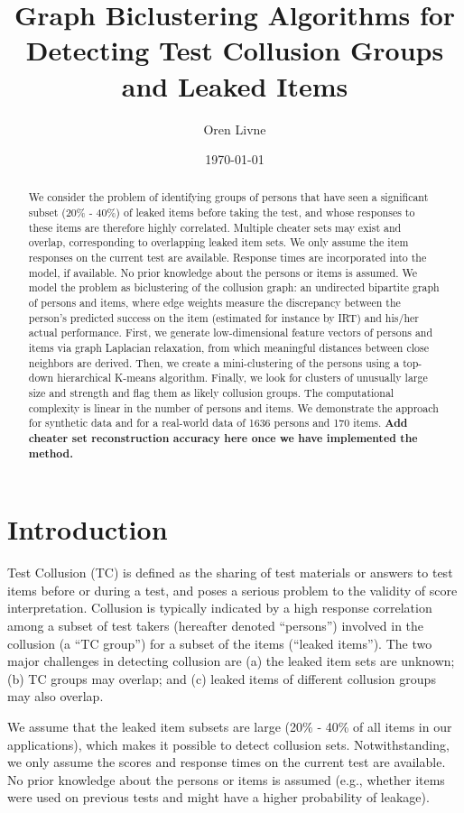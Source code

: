 \documentclass{article}
\title{Graph Biclustering Algorithms for Detecting Test Collusion Groups and Leaked Items}
\author[1]{Oren Livne}
\affil[1]{Educational Testing Service, 660 Rosedale Road, Attn: MS-12, T-197, Princeton, NJ 08540. Email: olivne@ets.org}
\date{\today}
\begin{document}
\maketitle

\begin{abstract}
We consider the problem of identifying groups of persons that have seen a significant subset (20\% - 40\%) of leaked items before taking the test, and whose responses to these items are therefore highly correlated. Multiple cheater sets may exist and overlap, corresponding to overlapping leaked item sets. We only assume the item responses on the current test are available. Response times are incorporated into the model, if available. No prior knowledge about the persons or items is assumed. We model the problem as biclustering of the collusion graph: an undirected bipartite graph of persons and items, where edge weights measure the discrepancy between the person's predicted success on the item (estimated for instance by IRT) and his/her actual performance. First, we generate low-dimensional feature vectors of persons and items via graph Laplacian relaxation, from which meaningful distances between close neighbors are derived. Then, we create a mini-clustering of the persons using a top-down hierarchical K-means algorithm. Finally, we look for clusters of unusually large size and strength and flag them as likely collusion groups. The computational complexity is linear in the number of persons and items. We demonstrate the approach for synthetic data and for a real-world data of 1636 persons and 170 items. {\bf Add cheater set reconstruction accuracy here once we have implemented the method.}
\end{abstract}

\section{Introduction}
Test Collusion (TC) is defined as the sharing of test materials or answers to test items before or during a test, and poses a serious problem to the validity of score interpretation. Collusion is typically indicated by a high response correlation among a subset of test takers (hereafter denoted ``persons'') involved in the collusion (a ``TC group'') for a subset of the items (``leaked items''). The two major challenges in detecting collusion are (a) the leaked item sets are unknown; (b) TC groups may overlap; and (c) leaked items of different collusion groups may also overlap.

We assume that the leaked item subsets are large (20\% - 40\% of all items in our applications), which makes it possible to detect collusion sets. Notwithstanding, we only assume the scores and response times on the current test are available. No prior knowledge about the persons or items is assumed (e.g., whether items were used on previous tests and might have a higher probability of leakage).
\end{document}
